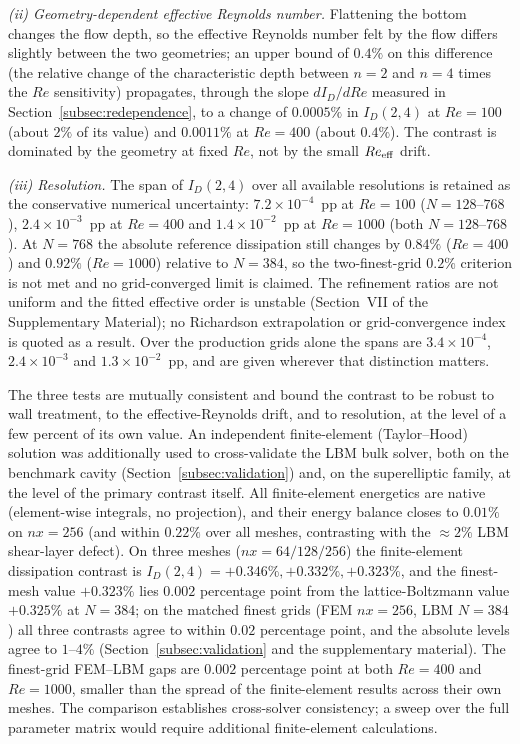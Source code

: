 \emph{(ii) Geometry-dependent effective Reynolds number.} Flattening the bottom changes the flow depth, so the effective Reynolds number felt by the flow differs slightly between the two geometries; an upper bound of $0.4\%$ on this difference (the relative change of the characteristic depth between $n=2$ and $n=4$ times the $Re$ sensitivity) propagates, through the slope $dI_D/dRe$ measured in Section~\ref{subsec:redependence}, to a change of $0.0005\%$ in $I_D(2,4)$ at $Re=100$ (about $2\%$ of its value) and $0.0011\%$ at $Re=400$ (about $0.4\%$). The contrast is dominated by the geometry at fixed $Re$, not by the small $Re_{\rm eff}$ drift.

\emph{(iii) Resolution.} The span of $I_D(2,4)$ over all available resolutions is retained as the conservative numerical uncertainty: $7.2\times10^{-4}$~pp at $Re=100$ ($N=128$--$768$), $2.4\times10^{-3}$~pp at $Re=400$ and $1.4\times10^{-2}$~pp at $Re=1000$ (both $N=128$--$768$). At $N=768$ the absolute reference dissipation still changes by $0.84\%$ ($Re=400$) and $0.92\%$ ($Re=1000$) relative to $N=384$, so the two-finest-grid $0.2\%$ criterion is not met and no grid-converged limit is claimed. The refinement ratios are not uniform and the fitted effective order is unstable (Section~VII of the Supplementary Material); no Richardson extrapolation or grid-convergence index is quoted as a result. Over the production grids alone the spans are $3.4\times10^{-4}$, $2.4\times10^{-3}$ and $1.3\times10^{-2}$~pp, and are given wherever that distinction matters.

The three tests are mutually consistent and bound the contrast to be robust to wall treatment, to the effective-Reynolds drift, and to resolution, at the level of a few percent of its own value. An independent finite-element (Taylor--Hood) solution was additionally used to cross-validate the LBM bulk solver, both on the benchmark cavity (Section~\ref{subsec:validation}) and, on the superelliptic family, at the level of the primary contrast itself. All finite-element energetics are native (element-wise integrals, no projection), and their energy balance closes to $0.01\%$ on $nx=256$ (and within $0.22\%$ over all meshes, contrasting with the $\approx 2\%$ LBM shear-layer defect). On three meshes ($nx=64/128/256$) the finite-element dissipation contrast is $I_D(2,4)=+0.346\%,+0.332\%,+0.323\%$, and the finest-mesh value $+0.323\%$ lies $0.002$ percentage point from the lattice-Boltzmann value $+0.325\%$ at $N=384$; on the matched finest grids (FEM $nx=256$, LBM $N=384$) all three contrasts agree to within $0.02$ percentage point, and the absolute levels agree to $1$--$4\%$ (Section~\ref{subsec:validation} and the supplementary material). The finest-grid FEM--LBM gaps are $0.002$ percentage point at both $Re=400$ and $Re=1000$, smaller than the spread of the finite-element results across their own meshes. The comparison establishes cross-solver consistency; a sweep over the full parameter matrix would require additional finite-element calculations.

